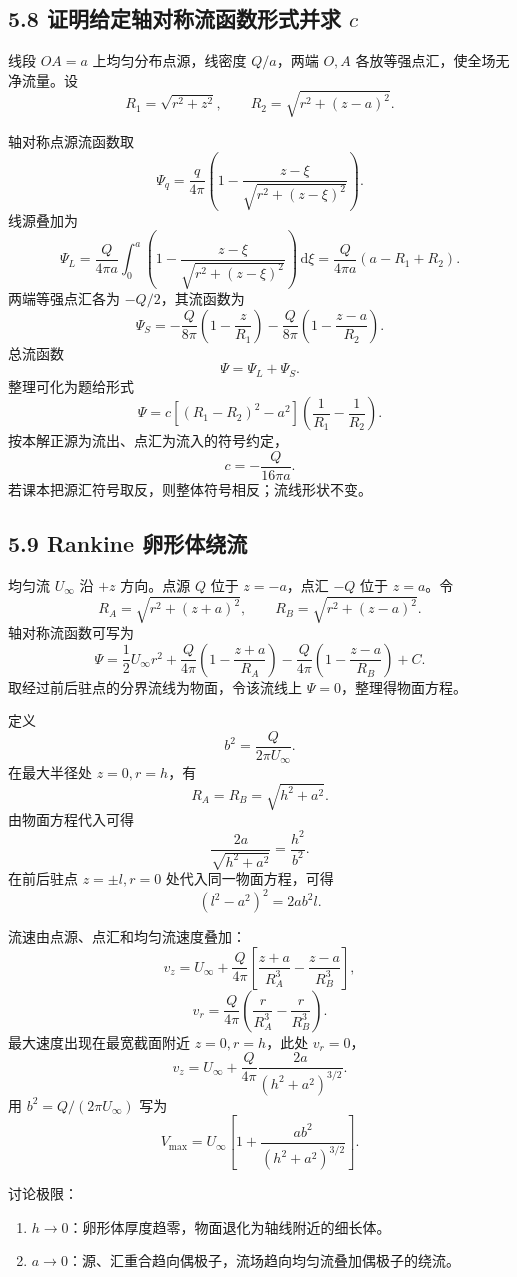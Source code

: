 ﻿\documentclass[UTF8,zihao=-4]{ctexart}
\newcommand{\dd}{\,\mathrm d}
\begin{document}
\subsection*{5.8 证明给定轴对称流函数形式并求 \(c\)}

线段 \(OA=a\) 上均匀分布点源，线密度 \(Q/a\)，两端 \(O,A\) 各放等强点汇，使全场无净流量。设
\[
R_1=\sqrt{r^2+z^2},\qquad
R_2=\sqrt{r^2+(z-a)^2}.
\]

轴对称点源流函数取
\[
\Psi_q=\frac{q}{4\pi}\left(1-\frac{z-\xi}{\sqrt{r^2+(z-\xi)^2}}\right).
\]
线源叠加为
\[
\Psi_L=\frac{Q}{4\pi a}\int_0^a
\left(1-\frac{z-\xi}{\sqrt{r^2+(z-\xi)^2}}\right)\dd\xi
=\frac{Q}{4\pi a}(a-R_1+R_2).
\]
两端等强点汇各为 \(-Q/2\)，其流函数为
\[
\Psi_S=-\frac{Q}{8\pi}\left(1-\frac{z}{R_1}\right)
-\frac{Q}{8\pi}\left(1-\frac{z-a}{R_2}\right).
\]
总流函数
\[
\Psi=\Psi_L+\Psi_S.
\]
整理可化为题给形式
\[
\Psi=c\left[(R_1-R_2)^2-a^2\right]
\left(\frac1{R_1}-\frac1{R_2}\right).
\]
按本解正源为流出、点汇为流入的符号约定，
\[
\boxed{c=-\frac{Q}{16\pi a}.}
\]
若课本把源汇符号取反，则整体符号相反；流线形状不变。

\subsection*{5.9 Rankine 卵形体绕流}

均匀流 \(U_\infty\) 沿 \(+z\) 方向。点源 \(Q\) 位于 \(z=-a\)，点汇 \(-Q\) 位于 \(z=a\)。令
\[
R_A=\sqrt{r^2+(z+a)^2},\qquad
R_B=\sqrt{r^2+(z-a)^2}.
\]
轴对称流函数可写为
\[
\Psi=\frac12U_\infty r^2
+\frac{Q}{4\pi}\left(1-\frac{z+a}{R_A}\right)
-\frac{Q}{4\pi}\left(1-\frac{z-a}{R_B}\right)+C .
\]
取经过前后驻点的分界流线为物面，令该流线上 \(\Psi=0\)，整理得物面方程。

定义
\[
b^2=\frac{Q}{2\pi U_\infty}.
\]
在最大半径处 \(z=0,r=h\)，有
\[
R_A=R_B=\sqrt{h^2+a^2}.
\]
由物面方程代入可得
\[
\boxed{
\frac{2a}{\sqrt{h^2+a^2}}=\frac{h^2}{b^2}.}
\]
在前后驻点 \(z=\pm l,r=0\) 处代入同一物面方程，可得
\[
\boxed{(l^2-a^2)^2=2ab^2l.}
\]

流速由点源、点汇和均匀流速度叠加：
\[
v_z=U_\infty+\frac{Q}{4\pi}
\left[\frac{z+a}{R_A^3}-\frac{z-a}{R_B^3}\right],
\]
\[
v_r=\frac{Q}{4\pi}\left(\frac{r}{R_A^3}-\frac{r}{R_B^3}\right).
\]
最大速度出现在最宽截面附近 \(z=0,r=h\)，此处 \(v_r=0\)，
\[
v_z=U_\infty+\frac{Q}{4\pi}\frac{2a}{(h^2+a^2)^{3/2}}.
\]
用 \(b^2=Q/(2\pi U_\infty)\) 写为
\[
\boxed{
V_{\max}=U_\infty\left[
1+\frac{ab^2}{(h^2+a^2)^{3/2}}
\right].}
\]

讨论极限：
\begin{enumerate}
  \item \(h\to0\)：卵形体厚度趋零，物面退化为轴线附近的细长体。
  \item \(a\to0\)：源、汇重合趋向偶极子，流场趋向均匀流叠加偶极子的绕流。
\end{enumerate}
\end{document}
